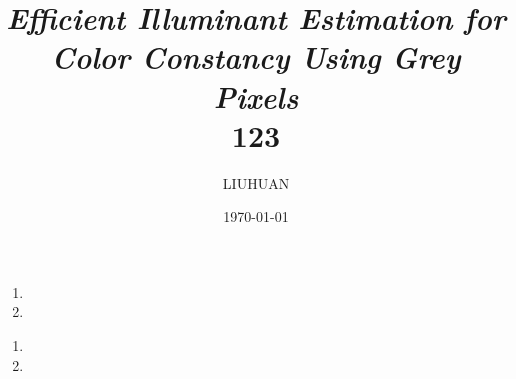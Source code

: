 \documentclass[a4paper,40pt]{article}
\begin{document}
        \title{\textit{Efficient Illuminant Estimation for Color Constancy Using Grey Pixels} \\123 }
        \author{LIUHUAN}
        \date{\today }
\maketitle

	
		\begin{enumerate}
		\item
	
		\item
	
		\end{enumerate}
		\begin{enumerate}
				\item
					\item
		\end{enumerate}


    \section{}
  
    \section{}
        \paragraph{}
       
        
\end{document}
